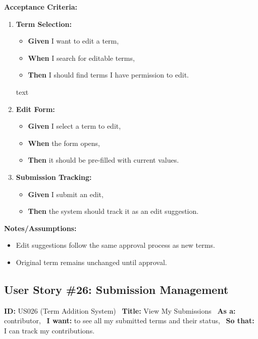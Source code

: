 \documentclass[12pt]{article}
\begin{document}
\vspace{1em}
\textbf{Acceptance Criteria:}
\begin{enumerate}
\item \textbf{Term Selection:}
\begin{itemize}
\item \textbf{Given} I want to edit a term,
\item \textbf{When} I search for editable terms,
\item \textbf{Then} I should find terms I have permission to edit.
\end{itemize}

text
\item \textbf{Edit Form:}
\begin{itemize}
    \item \textbf{Given} I select a term to edit,
    \item \textbf{When} the form opens,
    \item \textbf{Then} it should be pre-filled with current values.
\end{itemize}

\item \textbf{Submission Tracking:}
\begin{itemize}
    \item \textbf{Given} I submit an edit,
    \item \textbf{Then} the system should track it as an edit suggestion.
\end{itemize}
\end{enumerate}

\vspace{1em}
\textbf{Notes/Assumptions:}
\begin{itemize}
\item Edit suggestions follow the same approval process as new terms.
\item Original term remains unchanged until approval.
\end{itemize}

\subsection{User Story \#26: Submission Management}
\textbf{ID:} US026 (Term Addition System) \
\textbf{Title:} View My Submissions \
\textbf{As a:} contributor, \
\textbf{I want:} to see all my submitted terms and their status, \
\textbf{So that:} I can track my contributions.
\end{document}
